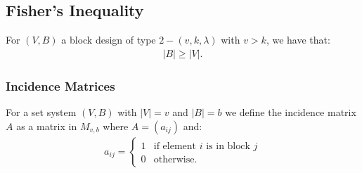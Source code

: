 \subsection{Fisher's Inequality}

For $(V, B)$ a block design of type $2 - (v, k, \lambda)$ with $v > k$,
we have that: \begin{gather*}
  |B| \geq |V|.
\end{gather*}

\subsubsection{Incidence Matrices}

For a set system $(V, B)$ with $|V| = v$ and $|B| = b$ we define the
incidence matrix $A$ as a matrix in $M_{v, b}$ where $A = (a_{ij})$ 
and: \begin{gather*}
  a_{ij} = \begin{cases}
    1 & \text{if element } i \text{ is in block } j \\
    0 & \text{otherwise}.
  \end{cases}
\end{gather*}